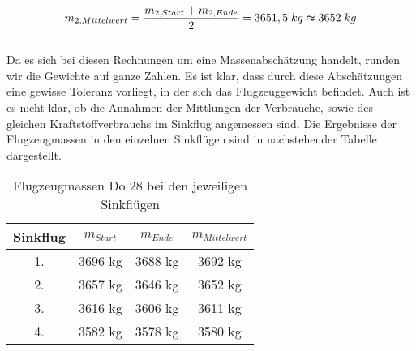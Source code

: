 \begin{equation*}
m_{2,Mittelwert} = \frac{m_{2,Start} + m_{2,Ende}}{2} = 3651,5 \; {kg} \thickapprox 3652 \; {kg}
\end{equation*} \\

\noindent Da es sich bei diesen Rechnungen um eine Massenabschätzung handelt, runden wir die Gewichte auf ganze Zahlen. Es ist klar, dass durch diese Abschätzungen eine gewisse Toleranz vorliegt, in der sich das Flugzeuggewicht befindet. Auch ist es nicht klar, ob die Annahmen der Mittlungen der Verbräuche, sowie des gleichen Kraftstoffverbrauchs im Sinkflug angemessen sind. Die Ergebnisse der Flugzeugmassen in den einzelnen Sinkflügen sind in nachstehender Tabelle dargestellt.\\

\begin{table}[h]
	\centering
	\begin{tabular}{|c|c|c|c|}
		\hline
		\textbf{Sinkflug} & \textbf{$m_{Start}$} & \textbf{$m_{Ende}$} & \textbf{$m_{Mittelwert}$} \\ \hline
		1.	& 3696 kg	& 3688 kg & 3692 kg    \\ \hline
		2.	& 3657 kg   & 3646 kg & 3652 kg    \\ \hline
		3.	& 3616 kg	& 3606 kg & 3611 kg	   \\ \hline
		4.  & 3582 kg	& 3578 kg & 3580 kg    \\ \hline
	
		
		
	\end{tabular}
	\caption{Flugzeugmassen Do 28 bei den jeweiligen Sinkflügen}
\end{table}


\newpage